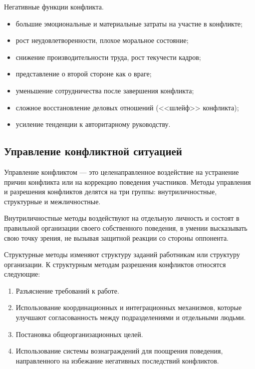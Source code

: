 \documentclass[a4paper,12pt,oneside,final]{extarticle}
\numberwithin{equation}{section}
\begin{document}
Негативные функции конфликта.
\begin{itemize}
	\item большие эмоциональные и материальные затраты на участие в конфликте;
	\item рост неудовлетворенности, плохое моральное состояние;
	\item снижение производительности труда, рост текучести кадров;
	\item представление о второй стороне как о враге;
	\item уменьшение сотрудничества после завершения конфликта;
	\item сложное восстановление деловых отношений (<<шлейф>> конфликта);
	\item усиление тенденции к авторитарному руководству.
\end{itemize}

\subsection{Управление конфликтной ситуацией}
Управление конфликтом --- это целенаправленное воздействие на устранение причин конфликта или на коррекцию поведения участников. 
Методы управления и разрешения конфликтов делятся на три группы: внутриличностные, структурные и межличностные.

Внутриличностные методы воздействуют на отдельную личность и состоят в правильной организации своего собственного поведения, в умении высказывать свою точку зрения, не вызывая защитной реакции со стороны оппонента.

Структурные методы изменяют структуру заданий работникам или структуру организации. 
К структурным методам разрешения конфликтов относятся следующие:
\begin{enumerate}
	\item Разъяснение требований к работе. 
	\item Использование координационных и интеграционных механизмов, которые улучшают согласованность между подразделениями и отдельными людьми.
	\item Постановка общеорганизационных целей.
	\item Использование системы вознаграждений для поощрения поведения, направленного на избежание негативных последствий конфликтов.
\end{enumerate}
\end{document}
